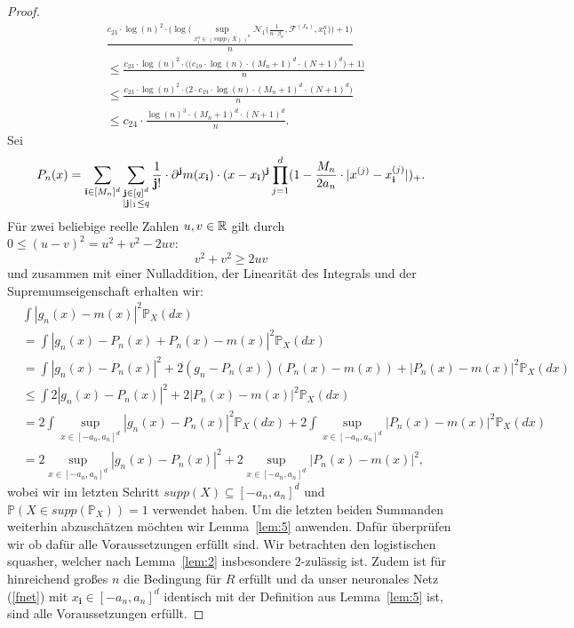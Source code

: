 \begin{proof}
\begin{equation}
\label{lem9sol}
\begin{split}
& \frac{c_{23} \cdot \log(n)^2 \cdot \big(\log\big(\sup_{x_1^n \in (supp(X))^n}\mathcal{N}_1\big(\frac{1}{n \cdot \beta_n},\mathcal{F}^{(J_n)},x_1^n\big)\big) + 1\big)}{n} \\
& \leq \frac{c_{23} \cdot \log(n)^2 \cdot \big(\big(c_{19} \cdot \log(n) \cdot (M_n + 1)^d \cdot (N + 1)^d \big) + 1\big)}{n} \\
& \leq \frac{c_{23} \cdot \log(n)^2 \cdot \big(2 \cdot c_{19} \cdot \log(n) \cdot (M_n + 1)^d \cdot (N + 1)^d\big)}{n} \\
& \leq c_{24} \cdot \frac{\log(n)^3 \cdot (M_n + 1)^d \cdot (N + 1)^d}{n}.
\end{split}
\end{equation}
Sei 
\begin{equation*}
\begin{split}
P_n(x) = \sum_{\mathbf{i} \in [M_n]^d} \sum_{\substack{ \mathbf{j} \in [q]^d \\ |\mathbf{j}|_1 \leq q}} \frac{1}{\mathbf{j}!} \cdot \partial^{\mathbf{j}} m (x_{\mathbf{i}}) \cdot (x - x_{\mathbf{i}})^{\mathbf{j}} \prod_{j = 1}^d(1 - \frac{M_n}{2a_n} \cdot |x^{(j)} - x_{\mathbf{i}}^{(j)}|)_+. 
\end{split}
\end{equation*}
Für zwei beliebige reelle Zahlen $u, v \in \mathbb{R}$ gilt durch $0 \leq (u - v)^2 = u^2 + v^2 - 2uv$:
$$v^2 + v^2 \geq 2uv$$ und zusammen mit einer Nulladdition, der Linearität des Integrals und der Supremumseigenschaft erhalten wir:
\begin{equation}
\label{gnmx}
\begin{split}
& \int |g_n(x) - m(x)|^2 \mathds{P}_X(dx) \\
& = \int |g_n(x) - P_n(x) + P_n(x) - m(x)|^2 \mathds{P}_X(dx) \\
& = \int |g_n(x) - P_n(x)|^2 + 2(g_n - P_n(x))(P_n(x) - m(x)) + |P_n(x) - m(x)|^2 \mathds{P}_X(dx) \\
& \leq \int 2 |g_n(x) - P_n(x)|^2 + 2 |P_n(x) - m(x)|^2 \mathds{P}_X(dx) \\
& = 2 \int \sup_{x \in [-a_n, a_n]^d} |g_n(x) - P_n(x)|^2 \mathds{P}_X(dx) + 2 \int \sup_{x \in [-a_n, a_n]^d} |P_n(x) - m(x)|^2 \mathds{P}_X(dx) \\
& = 2 \sup_{x \in [-a_n, a_n]^d} |g_n(x) - P_n(x)|^2 + 2 \sup_{x \in [-a_n, a_n]^d} |P_n(x) - m(x)|^2, 
\end{split}
\end{equation}
wobei wir im letzten Schritt $supp(X) \subseteq [-a_n, a_n]^d$ und $\mathds{P}(X \in supp(\mathds{P}_X)) = 1$ verwendet haben. Um die letzten beiden Summanden weiterhin abzuschätzen möchten wir Lemma~\ref{lem:5} anwenden. Dafür überprüfen wir ob dafür alle Voraussetzungen erfüllt sind. Wir betrachten den logistischen squasher, welcher nach Lemma~\ref{lem:2} insbesondere 2-zulässig ist. Zudem ist für hinreichend großes $n$ die Bedingung für $R$ erfüllt und da unser neuronales Netz (\ref{fnet}) mit $x_{\mathbf{i}} \in [-a_n, a_n]^d$ identisch mit der Definition aus Lemma~\ref{lem:5} ist, sind alle Voraussetzungen erfüllt. 

\end{proof}
